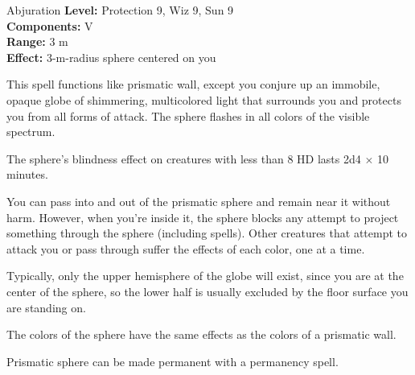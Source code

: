 {Abjuration}
{
	\textbf{Level:}
	Protection 9, Wiz 9, Sun 9\\
	\textbf{Components:}
	V\\
	\textbf{Range:}
	3 m\\
	\textbf{Effect:}
	3-m-radius sphere centered on you\\
}
{
	This spell functions like prismatic wall, except you conjure up an immobile, opaque globe of shimmering, multicolored light that surrounds you and protects you from all forms of attack. The sphere flashes in all colors of the visible spectrum.

	The sphere's blindness effect on creatures with less than 8 HD lasts 2d4 $\times$ 10 minutes.

	You can pass into and out of the prismatic sphere and remain near it without harm. However, when you're inside it, the sphere blocks any attempt to project something through the sphere (including spells). Other creatures that attempt to attack you or pass through suffer the effects of each color, one at a time.

	Typically, only the upper hemisphere of the globe will exist, since you are at the center of the sphere, so the lower half is usually excluded by the floor surface you are standing on.

	The colors of the sphere have the same effects as the colors of a prismatic wall.

	Prismatic sphere can be made permanent with a permanency spell.

}
